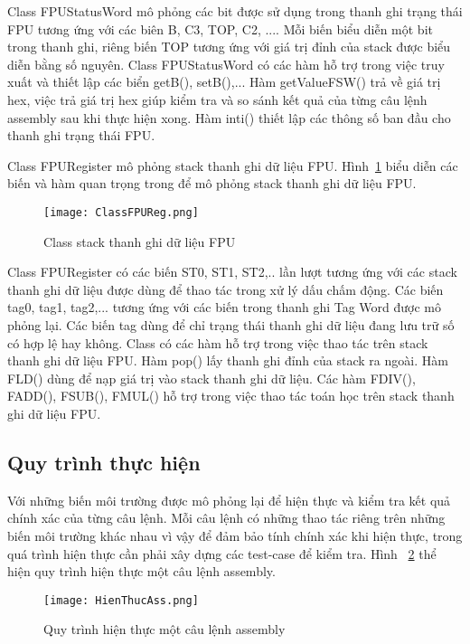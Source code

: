 		Class FPUStatusWord mô phỏng các bit được sử dụng trong thanh ghi trạng thái FPU tương ứng với các biên B, C3, TOP, C2, .... Mỗi biến biểu diễn một bit trong thanh ghi, riêng biến TOP tương ứng với giá trị đỉnh của stack được biểu diễn bằng số nguyên. Class FPUStatusWord có các hàm hỗ trợ trong việc truy xuất và thiết lập các biển getB(), setB(),... Hàm getValueFSW() trả về giá trị hex, việc trả giá trị hex giúp kiểm tra và so sánh kết quả của từng câu lệnh assembly sau khi thực hiện xong. Hàm inti() thiết lập các thông số ban đầu cho thanh ghi trạng thái FPU.
		
		\newpage
		Class FPURegister mô phỏng stack thanh ghi dữ liệu FPU. Hình~\ref{fig:FPUreg} biểu diễn các biến và hàm quan trọng trong để mô phỏng stack thanh ghi dữ liệu FPU.	
	\begin{center}
			\begin{figure}[htp]
				\begin{center}
					\texttt{[image: ClassFPUReg.png]}
				\end{center}
				\caption{Class stack thanh ghi dữ liệu FPU}	
					\label{fig:FPUreg}		
			\end{figure}
		\end{center}			
	
		Class FPURegister có các biến ST0, ST1, ST2,.. lần lượt tương ứng với các stack thanh ghi dữ liệu được dùng để thao tác trong xử lý dấu chấm động. Các biến tag0, tag1, tag2,... tương ứng với các biến trong thanh ghi Tag Word được mô phỏng lại. Các biến tag dùng để chỉ trạng thái thanh ghi dữ liệu đang lưu trữ số có hợp lệ hay không. Class có các hàm hỗ trợ trong việc thao tác trên stack thanh ghi dữ liệu FPU. Hàm pop() lấy thanh ghi đỉnh của stack ra ngoài. Hàm FLD() dùng để nạp giá trị vào stack thanh ghi dữ liệu. Các hàm FDIV(), FADD(), FSUB(), FMUL() hỗ trợ trong việc thao tác toán học trên stack thanh ghi dữ liệu FPU.
		
		\newpage
		\subsection{Quy trình thực hiện}		
		Với những biến môi trường được mô phỏng lại để hiện thực và kiểm tra kết quả chính xác của từng câu lệnh. Mỗi câu lệnh có những thao tác riêng trên những biến môi trường khác nhau vì vậy để đảm bảo tính chính xác khi hiện thực, trong quá trình hiện thực cần phải xây dựng các test-case để kiểm tra. Hình ~\ref{fig:HienThucAss} thể hiện quy trình hiện thực một câu lệnh assembly.
		\begin{center}
			\begin{figure}[htp]
				\begin{center}
					\texttt{[image: HienThucAss.png]}
				\end{center}
				\caption{Quy trình hiện thực một câu lệnh assembly}	
					\label{fig:HienThucAss}		
			\end{figure}
		\end{center}		
				
